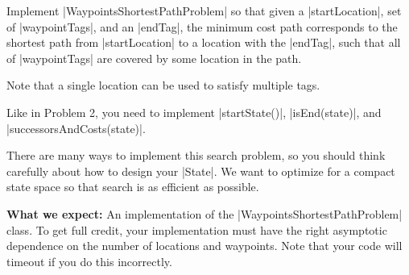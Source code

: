 \item {}

Implement |WaypointsShortestPathProblem| so that given a |startLocation|, set of |waypointTags|, and an |endTag|, the minimum cost path corresponds to the shortest path from |startLocation| to a location with the |endTag|, such that all of |waypointTags| are covered by some location in the path.

Note that a single location can be used to satisfy multiple tags.

Like in Problem 2, you need to implement |startState()|, |isEnd(state)|, and |successorsAndCosts(state)|.

There are many ways to implement this search problem, so you should think carefully about how to design your |State|. We want to optimize for a compact state space so that search is as efficient as possible.

\textbf{What we expect: } An implementation of the |WaypointsShortestPathProblem| class. To get full credit, your implementation must have the right asymptotic dependence on the number of locations and waypoints. Note that your code will timeout if you do this incorrectly.
